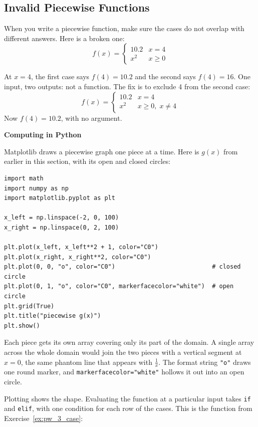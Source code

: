 \subsection{Invalid Piecewise Functions}
When you write a piecewise function, make sure the cases do not overlap
with different answers. Here is a broken one:
\begin{equation*}
  f(x) = \begin{cases}
    10.2 & x = 4   \\
    x^2  & x \ge 0
  \end{cases}
\end{equation*}

At $x=4$, the first case says $f(4) = 10.2$ and the second says
$f(4) = 16$. One input, two outputs: not a function. The fix is to exclude
4 from the second case:
\begin{equation*}
  f(x) =
  \begin{cases}
    10.2 & x = 4              \\
    x^2  & x \ge 0,\; x \ne 4
  \end{cases}
\end{equation*}
Now $f(4) = 10.2$, with no argument.

\textbf{Computing in Python}

Matplotlib draws a piecewise graph one piece at a time. Here is $g(x)$ from
earlier in this section, with its open and closed circles:

\begin{verbatim}
import math
import numpy as np
import matplotlib.pyplot as plt

x_left = np.linspace(-2, 0, 100)
x_right = np.linspace(0, 2, 100)

plt.plot(x_left, x_left**2 + 1, color="C0")
plt.plot(x_right, x_right**2, color="C0")
plt.plot(0, 0, "o", color="C0")                           # closed circle
plt.plot(0, 1, "o", color="C0", markerfacecolor="white")  # open circle
plt.grid(True)
plt.title("piecewise g(x)")
plt.show()
\end{verbatim}

Each piece gets its own array covering only its part of the domain. A single
array across the whole domain would join the two pieces with a vertical
segment at $x = 0$, the same phantom line that appears with $\frac{1}{x}$.
The format string \texttt{"o"} draws one round marker, and
\texttt{markerfacecolor="white"} hollows it out into an open
circle.

Plotting shows the shape. Evaluating the function at a particular input
takes \texttt{if} and \texttt{elif}, with one
condition for each row of the cases. This is the function from
Exercise~\ref{ex:pw_3_case}:


